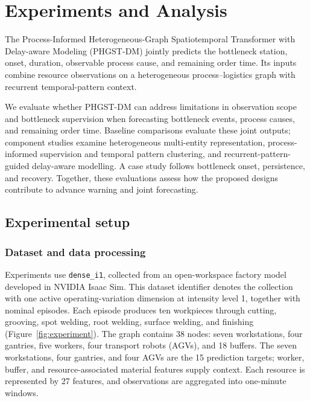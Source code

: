 \chapter{Experiments and Analysis}
\label{ch:experiments}
\label{sec:exp}

The Process-Informed Heterogeneous-Graph Spatiotemporal Transformer with Delay-aware Modeling (PHGST-DM) jointly predicts the bottleneck station, onset, duration, observable process cause, and remaining order time. Its inputs combine resource observations on a heterogeneous process--logistics graph with recurrent temporal-pattern context.

We evaluate whether PHGST-DM can address limitations in observation scope and bottleneck supervision when forecasting bottleneck events, process causes, and remaining order time. Baseline comparisons evaluate these joint outputs; component studies examine heterogeneous multi-entity representation, process-informed supervision and temporal pattern clustering, and recurrent-pattern-guided delay-aware modelling. A case study follows bottleneck onset, persistence, and recovery. Together, these evaluations assess how the proposed designs contribute to advance warning and joint forecasting.

\FloatBarrier
\section{Experimental setup}

\subsection{Dataset and data processing}

Experiments use \texttt{dense\_i1}, collected from an open-workspace factory model developed in NVIDIA Isaac Sim. This dataset identifier denotes the collection with one active operating-variation dimension at intensity level 1, together with nominal episodes. Each episode produces ten workpieces through cutting, grooving, spot welding, root welding, surface welding, and finishing (Figure~\ref{fig:experiment}). The graph contains 38 nodes: seven workstations, four gantries, five workers, four transport robots (AGVs), and 18 buffers. The seven workstations, four gantries, and four AGVs are the 15 prediction targets; worker, buffer, and resource-associated material features supply context. Each resource is represented by 27 features, and observations are aggregated into one-minute windows.

